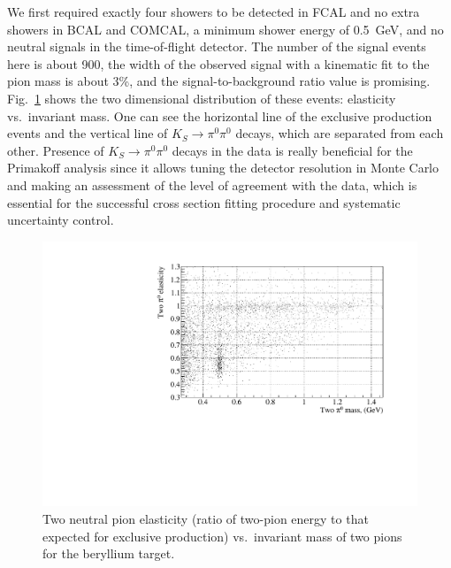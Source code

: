 We first required exactly four showers to be detected in FCAL and no
extra showers in BCAL and COMCAL, a minimum shower energy of
0.5~GeV, and no neutral signals in the time-of-flight detector. The number of the signal
events here is about 900, the width of the observed signal with a
kinematic fit to the pion mass is about 3\%, and the signal-to-background
ratio value is promising. Fig.~\ref{fig:2dbe} shows the two
dimensional distribution of these events: elasticity vs.\ invariant
mass. One can see the horizontal line of the exclusive production
events and the vertical line of $K_S\to\pi^0\pi^0$ decays, which are
separated from each other. Presence of $K_S\to\pi^0\pi^0$ decays
in the data is really beneficial for the Primakoff analysis since it
allows tuning the detector resolution in Monte Carlo and making an
assessment of the level of agreement with the data, which
is essential for the successful cross section fitting procedure and
systematic uncertainty control.
\begin{figure}[!h]
\centering\includegraphics[width=4.75in]{figures/2d_be.pdf}
\caption{Two neutral pion elasticity (ratio of two-pion energy to that expected
  for exclusive production) vs.\ invariant mass of two pions
  for the beryllium target.
\label{fig:2dbe}}
\end{figure}

